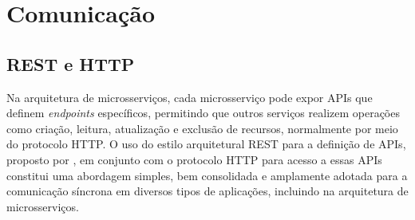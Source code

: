 







\section{Comunicação}

\subsection{REST e HTTP}
Na arquitetura de microsserviços, cada microsserviço pode expor APIs que definem \emph{endpoints} específicos, permitindo que outros serviços realizem operações como criação, leitura, atualização e exclusão de recursos, normalmente por meio do protocolo HTTP.
O uso do estilo arquitetural REST para a definição de APIs, proposto por , em conjunto com o protocolo HTTP para acesso a essas APIs constitui uma abordagem simples, bem consolidada e amplamente adotada para a comunicação síncrona em diversos tipos de aplicações, incluindo na arquitetura de microsserviços.


